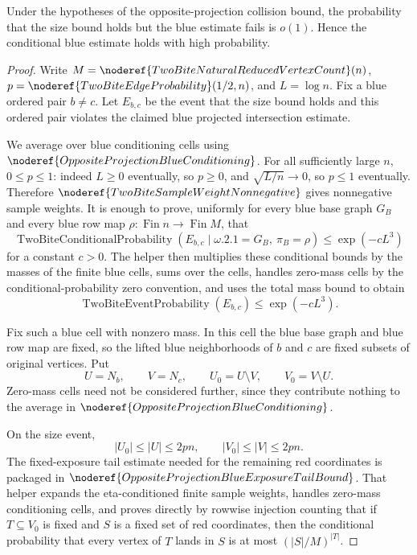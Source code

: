\begin{lemma}
Under the hypotheses of the opposite-projection collision bound, the probability that the size bound holds but the blue estimate fails is $o(1)$. Hence the conditional blue estimate holds with high probability.
\end{lemma}
\begin{proof}
Write \(M=\noderef{TwoBiteNaturalReducedVertexCount}(n)\),
\(p=\noderef{TwoBiteEdgeProbability}(1/2,n)\), and \(L=\log n\).  Fix a
blue ordered pair \(b\ne c\).  Let \(E_{b,c}\) be the event that the size
bound holds and this ordered pair violates the claimed blue projected
intersection estimate.

We average over blue conditioning cells using
\(\noderef{OppositeProjectionBlueConditioning}\).  For all sufficiently large
\(n\), \(0\le p\le1\): indeed \(L\ge0\) eventually, so \(p\ge0\), and
\(\sqrt{L/n}\to0\), so \(p\le1\) eventually.  Therefore
\(\noderef{TwoBiteSampleWeightNonnegative}\) gives nonnegative sample
weights.  It is enough to prove, uniformly for every blue base graph \(G_B\)
and every blue row map \(\rho:\operatorname{Fin}n\to\operatorname{Fin}M\),
that
\[
\operatorname{TwoBiteConditionalProbability}
  (E_{b,c}\mid \omega.2.1=G_B,\ \pi_B=\rho)
\le \exp(-cL^3)
\]
for a constant \(c>0\).  The helper then multiplies these conditional bounds
by the masses of the finite blue cells, sums over the cells, handles
zero-mass cells by the conditional-probability zero convention, and uses the
total mass bound to obtain
\[
\operatorname{TwoBiteEventProbability}(E_{b,c})\le \exp(-cL^3).
\]

Fix such a blue cell with nonzero mass.  In this cell the blue base graph and
blue row map are fixed, so the lifted blue neighborhoods of \(b\) and \(c\)
are fixed subsets of original vertices.  Put
\[
U=N_b,\qquad V=N_c,\qquad U_0=U\setminus V,\qquad V_0=V\setminus U.
\]
Zero-mass cells need not be considered further, since they contribute
nothing to the average in \(\noderef{OppositeProjectionBlueConditioning}\).

On the size event,
\[
|U_0|\le |U|\le 2pn,\qquad |V_0|\le |V|\le 2pn.
\]
The fixed-exposure tail estimate needed for the remaining red coordinates is
packaged in \(\noderef{OppositeProjectionBlueExposureTailBound}\).  That
helper expands the eta-conditioned finite sample weights, handles zero-mass
conditioning cells, and proves directly by rowwise injection counting that if
\(T\subseteq V_0\) is fixed and \(S\) is a fixed set of red coordinates, then
the conditional probability that every vertex of \(T\) lands in \(S\) is at
most \((|S|/M)^{|T|}\).


\end{proof}
